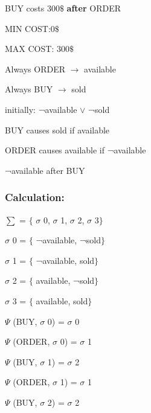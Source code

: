 \documentclass[11pt]{article}
\begin{document}
BUY costs 300$\$$  \textbf{after} ORDER\par


MIN COST:0$\$$ \par

MAX COST: 300$\$$ \par


Always ORDER $\rightarrow$ available\par

Always BUY $\rightarrow$ sold\par

initially: ¬available $\vee$  ¬sold\par

BUY causes sold if available\par

ORDER causes available if ¬available\par

¬available after BUY\\

\subsubsection{Calculation:}\label{par:p302}
\indent \par
$ \sum $ = $ \{ $ $ \sigma $ 0, $ \sigma $ 1, $ \sigma $ 2, $ \sigma $ 3$ \} $ \par

$ \sigma $ 0 = $ \{ $ ¬available, ¬sold$ \} $ \par

$ \sigma $ 1 = $ \{ $ ¬available, sold$ \} $ \par

$ \sigma $ 2 = $ \{ $ available, ¬sold$ \} $ \par

$ \sigma $ 3 = $ \{ $ available, sold$ \} $ \par
  \(  \Psi  \)  (BUY, $ \sigma $ 0) = $ \sigma $ 0\par

  \(  \Psi  \)  (ORDER, $ \sigma $ 0) = $ \sigma $ 1\par

  \(  \Psi  \)  (BUY, $ \sigma $ 1) = $ \sigma $ 2\par

 \(  \Psi  \)  (ORDER, $ \sigma $ 1) = $ \sigma $ 1\par

 \(  \Psi  \)  (BUY, $ \sigma $ 2) = $ \sigma $ 2\par
\end{document}
